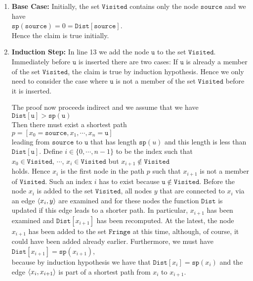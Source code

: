 \begin{enumerate}
\item \textbf{Base Case:}  
      Initially, the set $\mathtt{Visited}$ contains only the node $\mathtt{source}$ and we have
      \\[0.2cm]
      \hspace*{1.3cm}
      $\mathtt{sp}(\mathtt{source}) = 0 = \mathtt{Dist}[\mathtt{source}]$.
      \\[0.2cm]
      Hence the claim is true initially.
\item \textbf{Induction Step:}
      In line 13 we add the node $\mathtt{u}$ to the set $\mathtt{Visited}$.  Immediately before $\mathtt{u}$ is
      inserted there are two cases: If $\mathtt{u}$ is already a member of the set $\mathtt{Visited}$, the
      claim is true by induction hypothesis.  Hence we only need to consider the case where
     $\mathtt{u}$ is not a member of the set $\mathtt{Visited}$ before it is inserted.

      The proof now proceeds indirect and we assume that we have
      \\[0.2cm]
      \hspace*{1.3cm} $\mathtt{Dist}[\mathtt{u}] > \mathtt{sp}(\mathtt{u})$
      \\[0.2cm]
      Then there must exist a shortest path 
      \\[0.2cm]
      \hspace*{1.3cm} $p = [ x_0 = \mathtt{source}, x_1, \cdots, x_n = \mathtt{u} ]$
      \\[0.2cm]
      leading from $\mathtt{source}$ to $\mathtt{u}$ that has length $\mathtt{sp}(u)$ and this length is less
      than $\mathtt{Dist}[\mathtt{u}]$.  Define  $i\in\{0,\cdots,n-1\}$ to be the index such that
      \\[0.2cm]
      \hspace*{1.3cm}
      $x_0\in \mathtt{Visited}$, $\cdots$, $x_i\in \mathtt{Visited}$ \quad but \quad $x_{i+1} \not\in \mathtt{Visited}$
      \\[0.2cm]
      holds.  Hence $x_i$ is the first node in the path  $p$ such that $x_{i+1}$ is not a member of
      $\mathtt{Visited}$.  Such an index $i$ has to exist because $\mathtt{u} \not\in \mathtt{Visited}$.
      Before the node $x_i$ is added to the set $\mathtt{Visited}$, all nodes $y$ that are connected
      to $x_i$ via an edge $\pair(x_i, y)$ are examined and for these nodes the function
      $\mathtt{Dist}$ is updated if this edge leads to a shorter path.  In particular, $x_{i+1}$ has
      been examined and $\mathtt{Dist}[x_{i+1}]$ has been recomputed.  At the latest, the node
      $x_{i+1}$ has been added to the set  $\mathtt{Fringe}$ at this time, although, of course, it
      could have been added already earlier.  Furthermore, we must have
      \\[0.2cm]
      \hspace*{1.3cm}
      $\mathtt{Dist}[x_{i+1}] = \mathtt{sp}(x_{i+1})$,
      \\[0.2cm]
      because by induction hypothesis we have that $\mathtt{Dist}[x_i] = \mathtt{sp}(x_i)$ and 
      the edge $\pair(x_i,x_{i+1})$ is part of a shortest path from  $x_i$ to $x_{i+1}$.
      

\end{enumerate}
